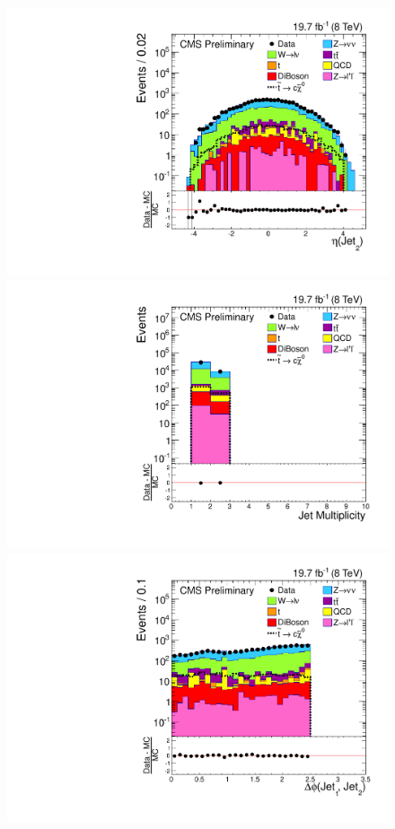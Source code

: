 \begin{figure}
\begin{center}
  \includegraphics[scale=0.30]     {Figures/sus13009/cut/Jet2Eta.pdf}
   \includegraphics[scale=0.30]     {Figures/sus13009/cut/NJet.pdf}
   \includegraphics[scale=0.30]     {Figures/sus13009/cut/dPhi_Jet1_Jet2.pdf}

\end{center}
\end{figure}
